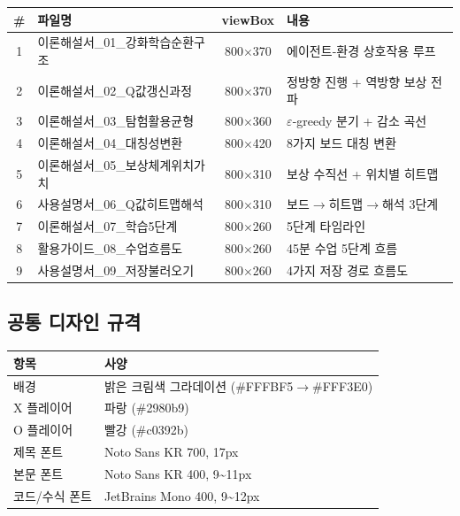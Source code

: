 \documentclass[11pt,a4paper]{article}
\begin{document}
\begin{center}
\renewcommand{\arraystretch}{1.3}
\small
\begin{tabular}{|c|p{4cm}|c|p{4.5cm}|}
\hline
\rowcolor{tableheader}
\textbf{\#} & \textbf{파일명} & \textbf{viewBox} & \textbf{내용} \\
\hline
1 & 이론해설서\_01\_강화학습순환구조 & 800$\times$370 & 에이전트-환경 상호작용 루프 \\
\hline
2 & 이론해설서\_02\_Q값갱신과정 & 800$\times$370 & 정방향 진행 + 역방향 보상 전파 \\
\hline
3 & 이론해설서\_03\_탐험활용균형 & 800$\times$360 & $\varepsilon$-greedy 분기 + 감소 곡선 \\
\hline
4 & 이론해설서\_04\_대칭성변환 & 800$\times$420 & 8가지 보드 대칭 변환 \\
\hline
5 & 이론해설서\_05\_보상체계위치가치 & 800$\times$310 & 보상 수직선 + 위치별 히트맵 \\
\hline
6 & 사용설명서\_06\_Q값히트맵해석 & 800$\times$310 & 보드$\to$히트맵$\to$해석 3단계 \\
\hline
7 & 이론해설서\_07\_학습5단계 & 800$\times$260 & 5단계 타임라인 \\
\hline
8 & 활용가이드\_08\_수업흐름도 & 800$\times$260 & 45분 수업 5단계 흐름 \\
\hline
9 & 사용설명서\_09\_저장불러오기 & 800$\times$260 & 4가지 저장 경로 흐름도 \\
\hline
\end{tabular}
\end{center}

\subsection{공통 디자인 규격}

\begin{center}
\renewcommand{\arraystretch}{1.4}
\begin{tabular}{|l|l|}
\hline
\rowcolor{tableheader}
\textbf{항목} & \textbf{사양} \\
\hline
배경 & 밝은 크림색 그라데이션 (\#FFFBF5$\to$\#FFF3E0) \\
\hline
X 플레이어 & 파랑 (\#2980b9) \\
\hline
O 플레이어 & 빨강 (\#c0392b) \\
\hline
제목 폰트 & Noto Sans KR 700, 17px \\
\hline
본문 폰트 & Noto Sans KR 400, 9\textasciitilde11px \\
\hline
코드/수식 폰트 & JetBrains Mono 400, 9\textasciitilde12px \\
\hline
\end{tabular}
\end{center}
\end{document}
